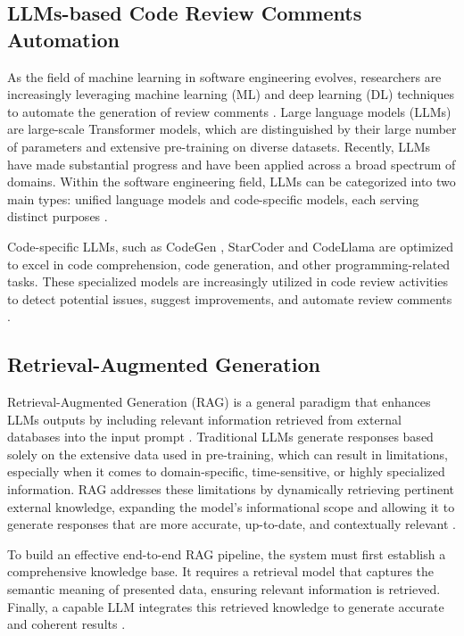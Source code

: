 \subsection{LLMs-based Code Review Comments Automation}
As the field of machine learning in software engineering evolves, researchers are increasingly leveraging machine learning (ML) and deep learning (DL) techniques to automate the generation of review comments \cite{li2022automating, tufano2022using, balachandran2013reducing, siow2020core, li2022auger, hong2022commentfinder}. Large language models (LLMs) are large-scale Transformer models, which are distinguished by their large number of parameters and extensive pre-training on diverse datasets.  Recently, LLMs have made substantial progress and have been applied across a broad spectrum of domains. Within the software engineering field, LLMs can be categorized into two main types: unified language models and code-specific models, each serving distinct purposes \cite{lu2023llama}.

Code-specific LLMs, such as CodeGen \cite{nijkamp2022codegen}, StarCoder \cite{li2023starcoder} and CodeLlama \cite{roziere2023code} are optimized to excel in code comprehension, code generation, and other programming-related tasks. These specialized models are increasingly utilized in code review activities to detect potential issues, suggest improvements, and automate review comments \cite{yang2024survey, lu2023llama}. 




\subsection{Retrieval-Augmented Generation}
Retrieval-Augmented Generation (RAG) is a general paradigm that enhances LLMs outputs by including relevant information retrieved from external databases into the input prompt \cite{gao2023retrieval}. Traditional LLMs generate responses based solely on the extensive data used in pre-training, which can result in limitations, especially when it comes to domain-specific, time-sensitive, or highly specialized information. RAG addresses these limitations by dynamically retrieving pertinent external knowledge, expanding the model's informational scope and allowing it to generate responses that are more accurate, up-to-date, and contextually relevant \cite{arslan2024business}. 

To build an effective end-to-end RAG pipeline, the system must first establish a comprehensive knowledge base. It requires a retrieval model that captures the semantic meaning of presented data, ensuring relevant information is retrieved. Finally, a capable LLM integrates this retrieved knowledge to generate accurate and coherent results \cite{ibtasham2024towards}.




